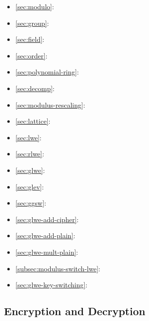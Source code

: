 \begin{tcolorbox}[
    title = \textbf{Required Background},    %
    colback = white,    %
    colframe = black,  %
    boxrule = 0.8pt,     %
    left = 1mm, right = 1mm, top = 1mm, bottom = 1mm %
]
\begin{itemize}
  \item \autoref{sec:modulo}: 
  \item \autoref{sec:group}: 
  \item \autoref{sec:field}: 
  \item \autoref{sec:order}: 
  \item \autoref{sec:polynomial-ring}: 
  \item \autoref{sec:decomp}: 
  \item \autoref{sec:modulus-rescaling}: 
  \item \autoref{sec:lattice}: 
  \item \autoref{sec:lwe}: 
  \item \autoref{sec:rlwe}: 
  \item \autoref{sec:glwe}: 
  \item \autoref{sec:glev}: 
  \item \autoref{sec:ggsw}: 
  \item \autoref{sec:glwe-add-cipher}: 
  \item \autoref{sec:glwe-add-plain}: 
  \item \autoref{sec:glwe-mult-plain}: 
  \item \autoref{subsec:modulus-switch-lwe}: 
  \item \autoref{sec:glwe-key-switching}: 
\end{itemize}
\end{tcolorbox}

\clearpage

\subsection{Encryption and Decryption}
\label{subsec:tfhe-enc-dec}

